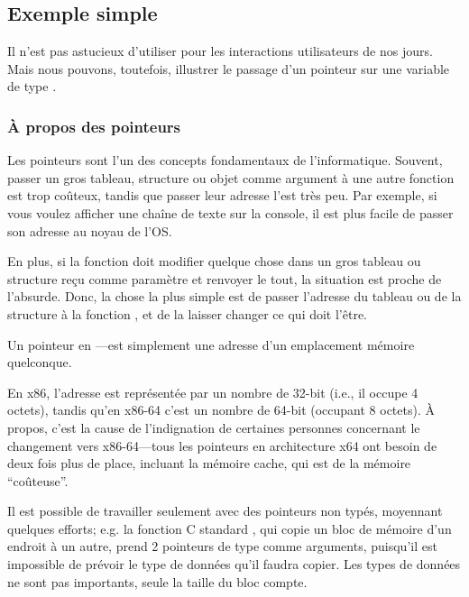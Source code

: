 \subsection{Exemple simple}



Il n'est pas astucieux d'utiliser \scanf pour les interactions utilisateurs de nos jours.
Mais nous pouvons, toutefois, illustrer le passage d'un pointeur sur une variable
de type \Tint.

\subsubsection{À propos des pointeurs}
\myindex{\CLanguageElements!\Pointers}

Les pointeurs sont l'un des concepts fondamentaux de l'informatique.
Souvent, passer un gros tableau, structure ou objet comme argument à une autre fonction
est trop coûteux, tandis que passer leur adresse l'est très peu.
Par exemple, si vous voulez afficher une chaîne de texte sur la console, il est
plus facile de passer son adresse au noyau de l'\ac{OS}.

En plus, si la fonction  doit modifier quelque chose dans
un gros tableau ou structure reçu comme paramètre et renvoyer le tout, la situation
est proche de l'absurde.
Donc, la chose la plus simple est de passer l'adresse du tableau ou de la structure
à la fonction , et de la laisser changer ce qui doit l'être.

Un pointeur en \CCpp---est simplement une adresse d'un emplacement mémoire quelconque.

En x86, l'adresse est représentée par un nombre de 32-bit (i.e., il occupe 4 octets),
tandis qu'en x86-64 c'est un nombre de 64-bit (occupant 8 octets).
À propos, c'est la cause de l'indignation de certaines personnes concernant le
changement vers x86-64---tous les pointeurs en architecture x64 ont besoin de deux
fois plus de place, incluant la mémoire cache, qui est de la mémoire ``coûteuse''.

Il est possible de travailler seulement avec des pointeurs non typés, moyennant
quelques efforts; e.g. la fonction C standard , qui copie un bloc de
mémoire d'un endroit à un autre, prend 2 pointeurs de type  comme arguments,
puisqu'il est impossible de prévoir le type de données qu'il faudra copier. Les types
de données ne sont pas importants, seule la taille du bloc compte.

